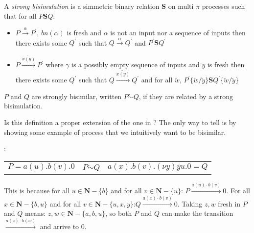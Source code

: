 \begin{definition}\label{strongLateBisimulation}
  A \emph{strong bisimulation} is a simmetric binary relation $\mathbf{S}$ on multi $\pi$ processes such that for all $P\mathbf{S}Q$:
   \begin{itemize}
     \item 
       $P \xrightarrow{\alpha} P^{'}$, $bn(\alpha)$ is fresh and $\alpha$ is not an input nor a sequence of inputs then there exists some $Q^{'}$ such that $Q \xrightarrow{\alpha} Q^{'}$ and $P^{'}\mathbf{S}Q^{'}$
     \item
       $P \xrightarrow{\widetilde{x(y)}} P^{'}$ where $\gamma$ is a possibly empty sequence of inputs and $\tilde{y}$ is fresh then there exists some $Q^{'}$ such that $Q \xrightarrow{\widetilde{x(y)}} Q^{'}$ and for all $\tilde{w}$, $P^{'}\{\tilde{w}/\tilde{y}\}\mathbf{S}Q^{'}\{\tilde{w}/\tilde{y}\}$
  \end{itemize}
  $P$ and $Q$ are strongly bisimilar, written $P \dot{\sim} Q$, if they are related by a strong bisimulation.
\end{definition}


Is this definition a proper extension of the one in \cite{parrow}? The only way to tell is by showing some example of process that we intuitively want to be bisimilar.
\begin{example}:
  \begin{center}
    \begin{tabular}{lll}
	$P=\underline{a(u)}.b(v).0$
      &
	$P \dot{\sim} Q$ 
      &
	$\underline{a(x)}.b(v).(\nu y)\overline{y}u.0=Q$
    \end{tabular}
  \end{center}
  This is because for all $u\in \mathbf{N}-\{b\}$ and for all $v\in \mathbf{N}-\{u\}$: $P \xrightarrow{a(u) \cdot b(v)} 0$. For all $x\in \mathbf{N}-\{b,u\}$ and for all $v\in \mathbf{N}-\{u,x,y\}$:$Q \xrightarrow{a(x) \cdot b(v)} 0$. Taking $z,w$ fresh in $P$ and $Q$ means: $z,w\in \mathbf{N}-\{a,b,u\}$, so both $P$ and $Q$ can make the transition $\xrightarrow{a(z) \cdot b(w)}$ and arrive to $0$.
\end{example}


